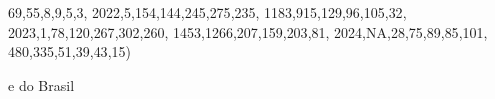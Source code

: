 \documentclass[
]{article}
\newenvironment{Shaded}{\begin{snugshade}}{\end{snugshade}}
\newcommand{\ConstantTok}[1]{\textcolor[rgb]{0.56,0.35,0.01}{#1}}
\newcommand{\DecValTok}[1]{\textcolor[rgb]{0.00,0.00,0.81}{#1}}
\newcommand{\NormalTok}[1]{#1}
\begin{document}
\begin{Shaded}
\begin{Highlighting}[]
                      \DecValTok{69}\NormalTok{,}\DecValTok{55}\NormalTok{,}\DecValTok{8}\NormalTok{,}\DecValTok{9}\NormalTok{,}\DecValTok{5}\NormalTok{,}\DecValTok{3}\NormalTok{,}
                    \DecValTok{2022}\NormalTok{,}\DecValTok{5}\NormalTok{,}\DecValTok{154}\NormalTok{,}\DecValTok{144}\NormalTok{,}\DecValTok{245}\NormalTok{,}\DecValTok{275}\NormalTok{,}\DecValTok{235}\NormalTok{,}
                      \DecValTok{1183}\NormalTok{,}\DecValTok{915}\NormalTok{,}\DecValTok{129}\NormalTok{,}\DecValTok{96}\NormalTok{,}\DecValTok{105}\NormalTok{,}\DecValTok{32}\NormalTok{,}
                    \DecValTok{2023}\NormalTok{,}\DecValTok{1}\NormalTok{,}\DecValTok{78}\NormalTok{,}\DecValTok{120}\NormalTok{,}\DecValTok{267}\NormalTok{,}\DecValTok{302}\NormalTok{,}\DecValTok{260}\NormalTok{,}
                      \DecValTok{1453}\NormalTok{,}\DecValTok{1266}\NormalTok{,}\DecValTok{207}\NormalTok{,}\DecValTok{159}\NormalTok{,}\DecValTok{203}\NormalTok{,}\DecValTok{81}\NormalTok{,}
                    \DecValTok{2024}\NormalTok{,}\ConstantTok{NA}\NormalTok{,}\DecValTok{28}\NormalTok{,}\DecValTok{75}\NormalTok{,}\DecValTok{89}\NormalTok{,}\DecValTok{85}\NormalTok{,}\DecValTok{101}\NormalTok{,}
                      \DecValTok{480}\NormalTok{,}\DecValTok{335}\NormalTok{,}\DecValTok{51}\NormalTok{,}\DecValTok{39}\NormalTok{,}\DecValTok{43}\NormalTok{,}\DecValTok{15}\NormalTok{)}
\end{Highlighting}
\end{Shaded}

e do Brasil
\end{document}
